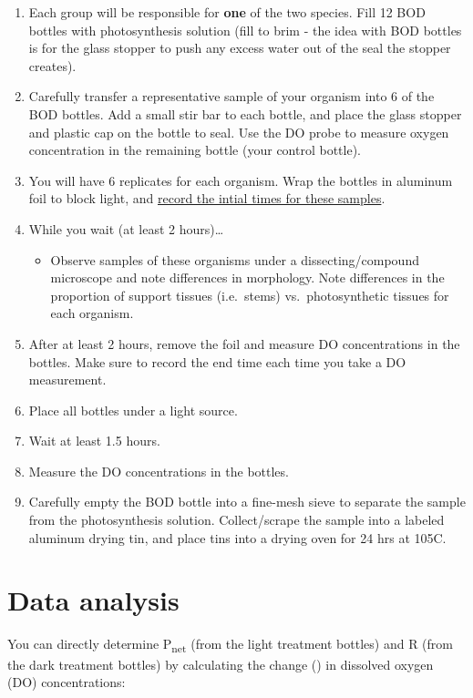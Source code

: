 \documentclass[11pt,]{article}
\providecommand{\tightlist}{%
\setlength{\itemsep}{0pt}\setlength{\parskip}{0pt}}
\begin{document}
\begin{enumerate}
\def\labelenumi{\arabic{enumi}.}
\tightlist
\item
  Each group will be responsible for \textbf{one} of the two species.
  Fill 12 BOD bottles with photosynthesis solution (fill to brim - the
  idea with BOD bottles is for the glass stopper to push any excess
  water out of the seal the stopper creates).
\item
  Carefully transfer a representative sample of your organism into 6 of
  the BOD bottles. Add a small stir bar to each bottle, and place the
  glass stopper and plastic cap on the bottle to seal. Use the DO probe
  to measure oxygen concentration in the remaining bottle (your control
  bottle).
\item
  You will have 6 replicates for each organism. Wrap the bottles in
  aluminum foil to block light, and
  \underline{record the intial times for these samples}.
\item
  While you wait (at least 2 hours)\ldots{}

  \begin{itemize}
  \tightlist
  \item
    Observe samples of these organisms under a dissecting/compound
    microscope and note differences in morphology. Note differences in
    the proportion of support tissues (i.e.~stems) vs.~photosynthetic
    tissues for each organism.
  \end{itemize}
\item
  After at least 2 hours, remove the foil and measure DO concentrations
  in the bottles. Make sure to record the end time each time you take a
  DO measurement.
\item
  Place all bottles under a light source.
\item
  Wait at least 1.5 hours.
\item
  Measure the DO concentrations in the bottles.
\item
  Carefully empty the BOD bottle into a fine-mesh sieve to separate the
  sample from the photosynthesis solution. Collect/scrape the sample
  into a labeled aluminum drying tin, and place tins into a drying oven
  for 24 hrs at 105\textdegree{}C.
\end{enumerate}

\section{Data analysis}\label{data-analysis}

You can directly determine P\textsubscript{net} (from the light
treatment bottles) and R (from the dark treatment bottles) by
calculating the change (\textDelta) in dissolved oxygen (DO)
concentrations:
\end{document}
